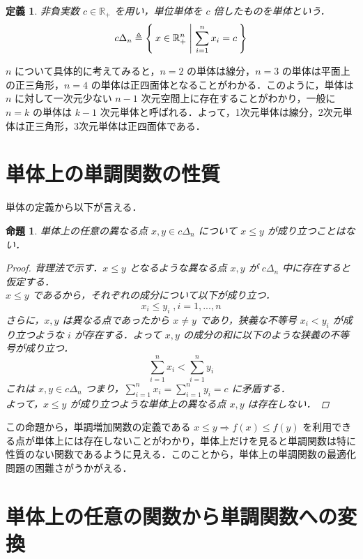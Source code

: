 \documentclass[a4paper,11pt]{jreport}
\newtheorem{definition}{定義}
\newtheorem{proposition}{命題}
\begin{document}
\begin{definition}
非負実数 $ c \in \mathbb{R}_+ $ を用い，単位単体を $ c $ 倍したものを単体という．
$$ c \Delta_n \triangleq \Set{ x \in \mathbb{R}^n_{+} | \sum_{i=1}^{n} x_i = c } $$
\end{definition}

$ n $ について具体的に考えてみると，$ n=2 $ の単体は線分，$ n=3 $ の単体は平面上の正三角形，$ n=4 $ の単体は正四面体となることがわかる．このように，単体は $ n $ に対して一次元少ない $ n - 1 $ 次元空間上に存在することがわかり，一般に $ n = k $ の単体は $ k - 1 $ 次元単体と呼ばれる．よって，1次元単体は線分，2次元単体は正三角形，3次元単体は正四面体である．\par

\section{単体上の単調関数の性質}

単体の定義から以下が言える．

\begin{proposition} \label{prop:inequality_on_simplex}
単体上の任意の異なる点 $ x, y \in c \Delta_n $ について $ x \leq y $ が成り立つことはない．

\begin{proof}
背理法で示す．$ x \leq y $ となるような異なる点 $ x, y $ が $ c \Delta_n $ 中に存在すると仮定する．\\
$ x \leq y $ であるから，それぞれの成分について以下が成り立つ．
$$ x_i \leq y_i \;, i = 1, ..., n $$
さらに，$ x , y $ は異なる点であったから $ x \neq y $ であり，狭義な不等号 $ x_i < y_i $ が成り立つような $ i $ が存在する．よって $ x, y $ の成分の和に以下のような狭義の不等号が成り立つ．
$$ \sum_{i=1}^n x_i < \sum_{i=1}^n y_i $$
これは $ x, y \in c \Delta_n $ つまり，$ \sum_{i=1}^n x_i = \sum_{i=1}^n y_i = c $ に矛盾する．\\
よって，$ x \leq y $ が成り立つような単体上の異なる点 $ x, y $ は存在しない．
\end{proof}

\end{proposition}

この命題から，単調増加関数の定義である $ x \leq y \Rightarrow f(x) \leq f(y) $ を利用できる点が単体上には存在しないことがわかり，単体上だけを見ると単調関数は特に性質のない関数であるように見える．このことから，単体上の単調関数の最適化問題の困難さがうかがえる．

\section{単体上の任意の関数から単調関数への変換}
\end{document}
